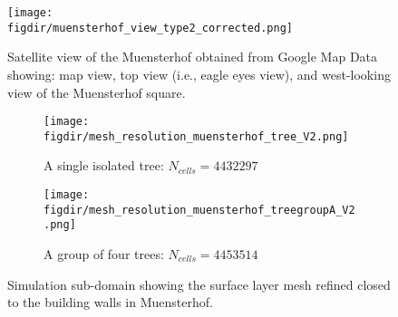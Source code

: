 
\begin{figure}[t]
	\centering
	\texttt{[image: \\figdir/muensterhof\_view\_type2\_corrected.png]}
	\caption{Satellite view of the Muensterhof obtained from Google Map Data showing:  map view,  top view (i.e., eagle eyes view), and  west-looking view of the Muensterhof square.}
	\label{fig:muensterhof_view}
\end{figure}

\begin{figure}[p]
	\centering
	\begin{subfigure}[b]{0.8\linewidth}
		\texttt{[image: \\figdir/mesh\_resolution\_muensterhof\_tree\_V2.png]}
		\caption{A single isolated tree: $N_{\textit{cells}} = \num{4432297}$}%
	\end{subfigure}
	
	\medskip
	
	\begin{subfigure}[b]{0.8\linewidth}
		\texttt{[image: \\figdir/mesh\_resolution\_muensterhof\_treegroupA\_V2.png]}
		\caption{A group of four trees: $N_{\textit{cells}} = \num{4453514}$}%
	\end{subfigure}
	\caption{Simulation sub-domain showing the surface layer mesh refined closed to the building walls in Muensterhof.}
	\label{fig:mesh_resolution_muensterhof_tree}
\end{figure}

